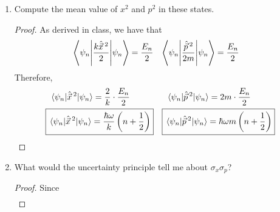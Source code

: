\documentclass[../psets.tex]{subfiles}
\begin{document}
\begin{enumerate}
\begin{enumerate}
\begin{proof}
            We have that
            \begin{align*}
                \ev{\hat{\vec{x}}}{\psi_n} &= \sqrt{\frac{\hbar}{2m\omega}}\left[ \ev{a_+}{\psi_n}+\ev{a_-}{\psi_n} \right]\\
                &= \sqrt{\frac{\hbar}{2m\omega}}\big[ \sqrt{n+1}\underbrace{\braket{\psi_n}{\psi_{n+1}}}_0+\sqrt{n}\underbrace{\braket{\psi_n}{\psi_{n-1}}}_0 \big]\\
                \Aboxed{\ev{\hat{\vec{x}}}{\psi_n} &= 0}
            \end{align*}
            and
            \begin{align*}
                \ev{\hat{\vec{p}}\,}{\psi_n} &= i\sqrt{\frac{\hbar m\omega}{2}}\left[ \ev{a_+}{\psi_n}-\ev{a_-}{\psi_n} \right]\\
                &= i\sqrt{\frac{\hbar m\omega}{2}}\big[ \sqrt{n+1}\underbrace{\braket{\psi_n}{\psi_{n+1}}}_0-\sqrt{n}\underbrace{\braket{\psi_n}{\psi_{n-1}}}_0 \big]\\
                \Aboxed{\ev{\hat{\vec{p}}\,}{\psi_n} &= 0}
            \end{align*}
        \end{proof}
        \item Compute the mean value of $x^2$ and $p^2$ in these states.
        \begin{proof}
            As derived in class, we have that
            \begin{align*}
                \ev**{\frac{k\hat{\vec{x}}{\,}^2}{2}}{\psi_n} &= \frac{E_n}{2}&
                \ev**{\frac{\hat{\vec{p}}{\,}^2}{2m}}{\psi_n} &= \frac{E_n}{2}
            \end{align*}
            Therefore,
            \begin{align*}
                \ev{\hat{\vec{x}}{\,}^2}{\psi_n} &= \frac{2}{k}\cdot\frac{E_n}{2}&
                    \ev{\hat{\vec{p}}{\,}^2}{\psi_n} &= 2m\cdot\frac{E_n}{2}\\
                \Aboxed{\ev{\hat{\vec{x}}{\,}^2}{\psi_n} &= \frac{\hbar\omega}{k}\left( n+\frac{1}{2} \right)}&
                    \Aboxed{\ev{\hat{\vec{p}}{\,}^2}{\psi_n} &= \hbar\omega m\left( n+\frac{1}{2} \right)}
            \end{align*}
        \end{proof}
        \item What would the uncertainty principle tell me about $\sigma_x\sigma_p$?
        \begin{proof}
            Since
            \begin{align*}

\end{align*}
\end{proof}
\end{enumerate}
\end{enumerate}
\end{document}
